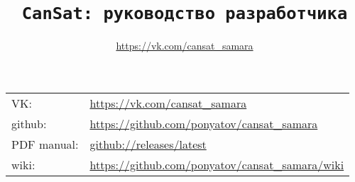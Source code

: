 

\title{\LARGE{\texttt{CanSat: руководство разработчика}}}
\author{\url{https://vk.com/cansat_samara}}



\maketitle

\tableofcontents
\secdown

\clearpage
{}

\noindent
\begin{tabular}{l l}
VK: &\url{https://vk.com/cansat_samara}\\
github: &\url{https://github.com/ponyatov/cansat_samara}\\
PDF manual: &\href{https://github.com/ponyatov/cansat_samara/releases/latest}{github://releases/latest} \\
wiki: &\url{https://github.com/ponyatov/cansat_samara/wiki}\\
\end{tabular}









